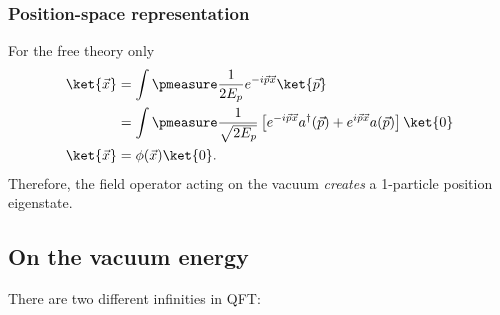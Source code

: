 \subsubsection{Position-space representation}
For the free theory only
\begin{align}
	\ket{\vec{x}}&=\int \pmeasure \frac{1}{2E_p} e^{-i \vec{p}\vec{x}} \ket{\vec{p}}\\
	&=\int \pmeasure \frac{1}{\sqrt{2E_p}} \left[e^{-i \vec{p}\vec{x}} a^{\dagger}(\vec{p}) + e^{i \vec{p}\vec{x}} a(\vec{p})\right] \ket{0}\\
	\ket{\vec{x}} &= \phi(\vec{x}) \ket{0}.
\end{align}
Therefore, the field operator acting on the vacuum \emph{creates}  a 1-particle position eigenstate.


\subsection{On the vacuum energy}
There are two different infinities in QFT:
